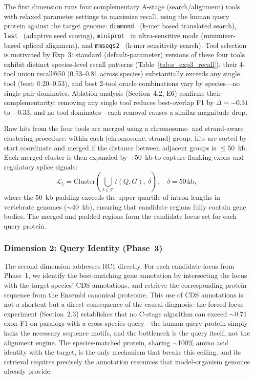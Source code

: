 The first dimension runs four complementary A-stage (search/alignment) tools with relaxed parameter settings to maximize recall, using the human query protein against the target genome: \texttt{diamond}~\cite{buchfink2021diamond} (k-mer based translated search), \texttt{last}~\cite{kielbasa2011last} (adaptive seed scoring), \texttt{miniprot}~\cite{li2023miniprot} in ultra-sensitive mode (minimizer-based spliced alignment), and \texttt{mmseqs2}~\cite{steinegger2017mmseqs2} (k-mer sensitivity search). Tool selection is motivated by Exp~3: standard (default-parameter) versions of these four tools exhibit distinct species-level recall patterns (Table~\ref{tab:s_exp3_recall}), their 4-tool union recall@50 (0.53--0.81 across species) substantially exceeds any single tool (best: 0.20--0.53), and best 2-tool oracle combinations vary by species---no single pair dominates. Ablation analysis (Section~4.2, E6) confirms their complementarity: removing any single tool reduces best-overlap F1 by $\Delta = -0.31$ to $-0.33$, and no tool dominates---each removal causes a similar-magnitude drop.

Raw hits from the four tools are merged using a chromosome- and strand-aware clustering procedure: within each (chromosome, strand) group, hits are sorted by start coordinate and merged if the distance between adjacent groups is $\leq$50~kb. Each merged cluster is then expanded by $\pm$50~kb to capture flanking exons and regulatory splice signals:
\begin{equation}
\mathcal{L}_{1} = \text{Cluster}\!\left(\bigcup_{t \in \mathcal{T}} t(Q, G),\; \delta\right), \quad \delta = 50\,\text{kb},
\label{eq:clustering}
\end{equation}
where the 50~kb padding exceeds the upper quartile of intron lengths in vertebrate genomes ($\sim$40~kb), ensuring that candidate regions fully contain gene bodies. The merged and padded regions form the candidate locus set for each query protein.

\subsubsection{Dimension 2: Query Identity (Phase~3)}

The second dimension addresses RC1 directly. For each candidate locus from Phase~1, we identify the best-matching gene annotation by intersecting the locus with the target species' CDS annotations, and retrieve the corresponding protein sequence from the Ensembl canonical proteome. This use of CDS annotations is not a shortcut but a direct consequence of the causal diagnosis: the forced-locus experiment (Section~2.3) establishes that no C-stage algorithm can exceed $\sim$0.71 exon F1 on paralogs with a cross-species query---the human query protein simply lacks the necessary sequence motifs, and the bottleneck is the query itself, not the alignment engine. The species-matched protein, sharing $\sim$100\% amino acid identity with the target, is the only mechanism that breaks this ceiling, and its retrieval requires precisely the annotation resources that model-organism genomes already provide.

